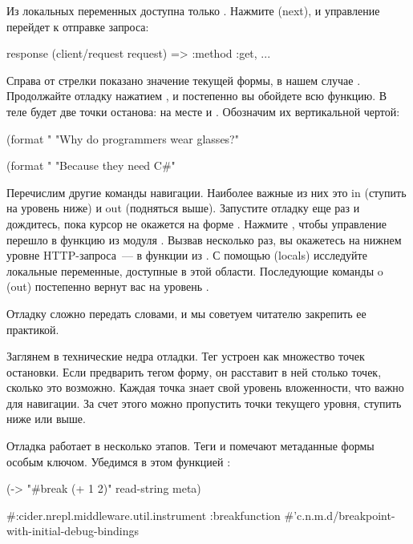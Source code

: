 Из локальных переменных доступна только . Нажмите  (next), и управление перейдет к отправке запроса:

\begin{english}
  \begin{clojure}
response
(client/request request) => {:method :get, ...}
  \end{clojure}
\end{english}

Справа от стрелки показано значение текущей формы, в нашем случае . Продолжайте отладку нажатием , и постепенно вы обойдете всю функцию. В теле  будет две точки останова: на месте  и . Обозначим их вертикальной чертой:

\begin{english}
  \begin{clojure}
(format "%
  "Why do programmers wear glasses?"

(format "%
  "Because they need C#"
  \end{clojure}
\end{english}

Перечислим другие команды навигации. Наиболее важные из них это in (ступить на уровень ниже) и out (подняться выше). Запустите отладку еще раз и дождитесь, пока курсор не окажется на форме . Нажмите , чтобы управление перешло в функцию  из модуля . Вызвав  несколько раз, вы окажетесь на нижнем уровне HTTP-запроса~--- в функции  из . С помощью  (locals) исследуйте локальные переменные, доступные в этой области. Последующие команды o (out) постепенно вернут вас на уровень .

Отладку сложно передать словами, и мы советуем читателю закрепить ее практикой.

Заглянем в технические недра отладки. Тег  устроен как множество точек остановки. Если предварить тегом форму, он расставит в ней столько точек, сколько это возможно. Каждая точка знает свой уровень вложенности, что важно для навигации. За счет этого можно пропустить точки текущего уровня, ступить ниже или выше.

Отладка работает в несколько этапов. Теги  и  помечают метаданные формы особым ключом. Убедимся в этом функцией :

\begin{english}
  \begin{clojure}
(-> "#break (+ 1 2)"
    read-string
    meta)

#:cider.nrepl.middleware.util.instrument
{:breakfunction
 #'c.n.m.d/breakpoint-with-initial-debug-bindings}
  \end{clojure}
\end{english}

